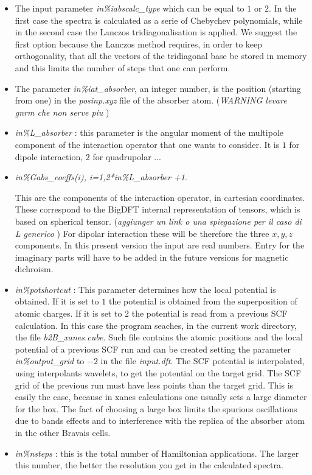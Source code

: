 \documentclass[a4paper,11pt]{report}
\begin{document}
\begin{itemize}
\item The input parameter {\it in\%iabscalc\_type} which can be equal to  $1$
or $2$. In the first case the spectra is calculated as a serie of
Chebychev polynomials, while in the second case the Lanczos
tridiagonalisation is applied. We suggest the first option
because the Lanczos method requires, in order to keep orthogonality,
 that all the vectors of the tridiagonal base be stored in memory
and this limits the number of steps that one can perform.

\item The  parameter {\it in\%iat\_absorber}, an integer number,
is the position (starting from one) in  the {\it posinp.xyz} file
 of the absorber atom. ({\it WARNING levare gnrm che non serve piu} )

\item  {\it in\%L\_absorber} : this parameter is the angular moment
of the multipole component of the interaction operator that 
one wants to consider. It is $1$ for dipole interaction, $2$ for
quadrupolar ...

\item {\it in\%Gabs\_coeffs(i), i=1,2*in\%L\_absorber +1}.

This are the components of the interaction operator, in cartesian
coordinates. These correspond to the BigDFT internal representation 
of tensors, which is based on spherical tensor. 
({\it aggiunger un link o una spiegazione per il caso di L  generico })
For dipolar interaction these will be therefore the three $x,y,z$
components. In this present version the input are real numbers.
Entry for the imaginary parts will have to be added in the future versions 
for magnetic dichroism.

\item   {\it in\%potshortcut } : This parameter determines how the 
local potential is obtained. If it is set to $1$ the potential is
obtained from the superposition of atomic charges.
If it is set to $2$ the potential is read from a previous SCF
calculation. In this case the program seaches, in the current work directory,
the file {\it b2B\_xanes.cube}. Such file contains the atomic positions
and the local potential of a previous SCF run and can be created
setting the parameter {\it in\%output\_grid} to $-2$ in
the file {\it input.dft}. The SCF potential is interpolated, using
interpolants wavelets, to get the potential on the target grid.
The SCF grid of the previous run must have less points than the target
grid.
This is easily the case, because in xanes calculations one usually
sets a large diameter for the box. The fact of choosing a large box 
 limits the spurious oscillations due to bands effects and to interference with the replica
of the absorber atom in the other Bravais cells. 

\item {\it in\%nsteps } : this is the total number of Hamiltonian
  applications. The larger this number, the better the resolution you get
  in the calculated spectra.

\end{itemize}
\end{document}
